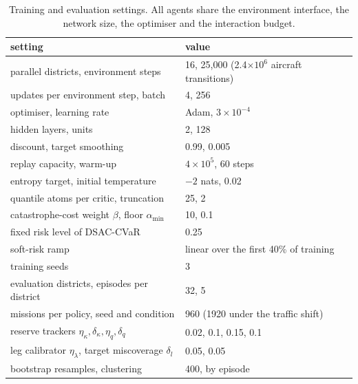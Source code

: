 \begin{table}[tb]
\centering
\caption{Training and evaluation settings. All agents share the environment interface, the network size, the optimiser and the interaction budget.}
\label{tab:hyper}
\small
\begin{tabular}{ll}
\toprule
setting & value \\
\midrule
parallel districts, environment steps & 16, 25{,}000 (2.4$\times10^{6}$ aircraft transitions) \\
updates per environment step, batch & 4, 256 \\
optimiser, learning rate & Adam, $3\times10^{-4}$ \\
hidden layers, units & 2, 128 \\
discount, target smoothing & 0.99, 0.005 \\
replay capacity, warm-up & $4\times10^{5}$, 60 steps \\
entropy target, initial temperature & $-2$ nats, 0.02 \\
quantile atoms per critic, truncation & 25, 2 \\
catastrophe-cost weight $\beta$, floor $\alpha_{\min}$ & 10, 0.1 \\
fixed risk level of DSAC-CVaR & 0.25 \\
soft-risk ramp & linear over the first 40\% of training \\
training seeds & 3 \\
\addlinespace[2pt]
evaluation districts, episodes per district & 32, 5 \\
missions per policy, seed and condition & 960 (1920 under the traffic shift) \\
reserve trackers $\eta_\kappa,\delta_\kappa,\eta_q,\delta_q$ & 0.02, 0.1, 0.15, 0.1 \\
leg calibrator $\eta_\lambda$, target miscoverage $\delta_l$ & 0.05, 0.05 \\
bootstrap resamples, clustering & 400, by episode \\
\bottomrule
\end{tabular}
\end{table}
